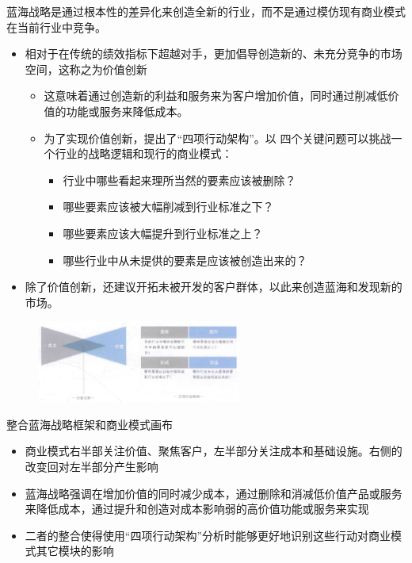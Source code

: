 蓝海战略是通过根本性的差异化来创造全新的行业，而不是通过模仿现有商业模式在当前行业中竞争。
\begin{itemize}
    \item 相对于在传统的绩效指标下超越对手，更加倡导创造新的、未充分竞争的市场空间，这称之为价值创新
    \begin{itemize}
        \item 这意味着通过创造新的利益和服务来为客户增加价值，同时通过削减低价值的功能或服务来降低成本。
        \item 为了实现价值创新，提出了“四项行动架构”。以 四个关键问题可以挑战一个行业的战略逻辑和现行的商业模式：
        \begin{itemize}
            \item 行业中哪些看起来理所当然的要素应该被删除？
            \item 哪些要素应该被大幅削减到行业标准之下？
            \item 哪些要素应该大幅提升到行业标准之上？
            \item 哪些行业中从未提供的要素是应该被创造出来的？
        \end{itemize}
    \end{itemize}
    \item 除了价值创新，还建议开拓未被开发的客户群体，以此来创造蓝海和发现新的市场。
\end{itemize}

\begin{figure}[H]
	\centering
	\vspace{-0.5em}
	\includegraphics[width=0.6\textwidth]{img/蓝海战略.png}
    \vspace{-0.5em}
\end{figure}

整合蓝海战略框架和商业模式画布
\begin{itemize}
    \item 商业模式右半部关注价值、聚焦客户，左半部分关注成本和基础设施。右侧的改变回对左半部分产生影响
    \item 蓝海战略强调在增加价值的同时减少成本，通过删除和消减低价值产品或服务来降低成本，通过提升和创造对成本影响弱的高价值功能或服务来实现
    \item 二者的整合使得使用“四项行动架构”分析时能够更好地识别这些行动对商业模式其它模块的影响
\end{itemize}

